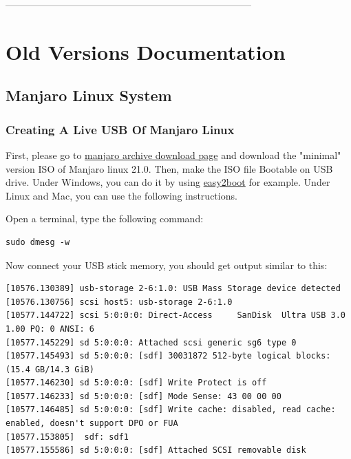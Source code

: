  -----------------------------------------------------------------------------%

\section{Old Versions Documentation}


\subsection{Manjaro Linux System}

\subsubsection{Creating A Live USB Of Manjaro Linux}
\label{usbLiveCreation}
\par First, please go to 
\href{https://manjaro.org/downloads/official/xfce/}
{manjaro archive download page} and download the "minimal" version ISO of 
Manjaro linux 21.0.
Then, make the ISO file Bootable on USB drive. Under Windows, you
can do it by using \href{https://www.easy2boot.com}{easy2boot} for example. 
Under Linux and Mac, you can use the following instructions.
\newline
\par
Open a terminal, type the following command: 
\begin{lstlisting}[language=commandline]
sudo dmesg -w
\end{lstlisting}

Now connect your USB stick memory, you should get output similar to this:
\begin{lstlisting}[language=commandline, style=output]
[10576.130389] usb-storage 2-6:1.0: USB Mass Storage device detected
[10576.130756] scsi host5: usb-storage 2-6:1.0
[10577.144722] scsi 5:0:0:0: Direct-Access     SanDisk  Ultra USB 3.0    
1.00 PQ: 0 ANSI: 6
[10577.145229] sd 5:0:0:0: Attached scsi generic sg6 type 0
[10577.145493] sd 5:0:0:0: [sdf] 30031872 512-byte logical blocks: 
(15.4 GB/14.3 GiB)
[10577.146230] sd 5:0:0:0: [sdf] Write Protect is off
[10577.146233] sd 5:0:0:0: [sdf] Mode Sense: 43 00 00 00
[10577.146485] sd 5:0:0:0: [sdf] Write cache: disabled, read cache: 
enabled, doesn't support DPO or FUA
[10577.153805]  sdf: sdf1
[10577.155586] sd 5:0:0:0: [sdf] Attached SCSI removable disk
\end{lstlisting}

